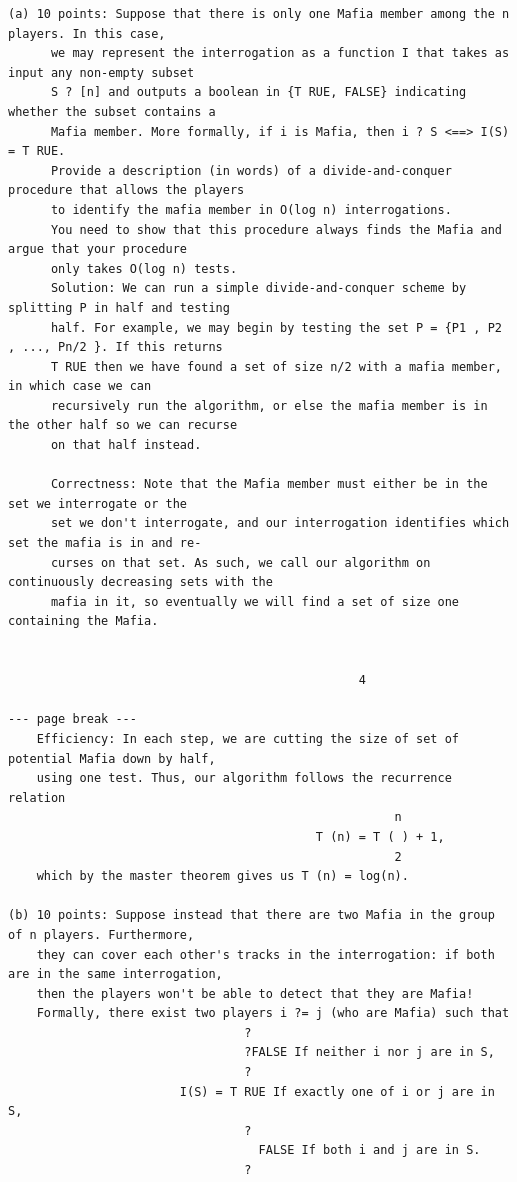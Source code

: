 \documentclass[12pt]{article}
\begin{document}
\begin{Verbatim}[breaklines=true,fontsize=\small]
  (a) 10 points: Suppose that there is only one Mafia member among the n players. In this case,
      we may represent the interrogation as a function I that takes as input any non-empty subset
      S ? [n] and outputs a boolean in {T RUE, FALSE} indicating whether the subset contains a
      Mafia member. More formally, if i is Mafia, then i ? S <==> I(S) = T RUE.
      Provide a description (in words) of a divide-and-conquer procedure that allows the players
      to identify the mafia member in O(log n) interrogations.
      You need to show that this procedure always finds the Mafia and argue that your procedure
      only takes O(log n) tests.
      Solution: We can run a simple divide-and-conquer scheme by splitting P in half and testing
      half. For example, we may begin by testing the set P = {P1 , P2 , ..., Pn/2 }. If this returns
      T RUE then we have found a set of size n/2 with a mafia member, in which case we can
      recursively run the algorithm, or else the mafia member is in the other half so we can recurse
      on that half instead.

      Correctness: Note that the Mafia member must either be in the set we interrogate or the
      set we don't interrogate, and our interrogation identifies which set the mafia is in and re-
      curses on that set. As such, we call our algorithm on continuously decreasing sets with the
      mafia in it, so eventually we will find a set of size one containing the Mafia.


                                                 4

--- page break ---
    Efficiency: In each step, we are cutting the size of set of potential Mafia down by half,
    using one test. Thus, our algorithm follows the recurrence relation
                                                      n
                                           T (n) = T ( ) + 1,
                                                      2
    which by the master theorem gives us T (n) = log(n).

(b) 10 points: Suppose instead that there are two Mafia in the group of n players. Furthermore,
    they can cover each other's tracks in the interrogation: if both are in the same interrogation,
    then the players won't be able to detect that they are Mafia!
    Formally, there exist two players i ?= j (who are Mafia) such that
                                 ?
                                 ?FALSE If neither i nor j are in S,
                                 ?
                        I(S) = T RUE If exactly one of i or j are in S,
                                 ?
                                   FALSE If both i and j are in S.
                                 ?



\end{Verbatim}
\end{document}
